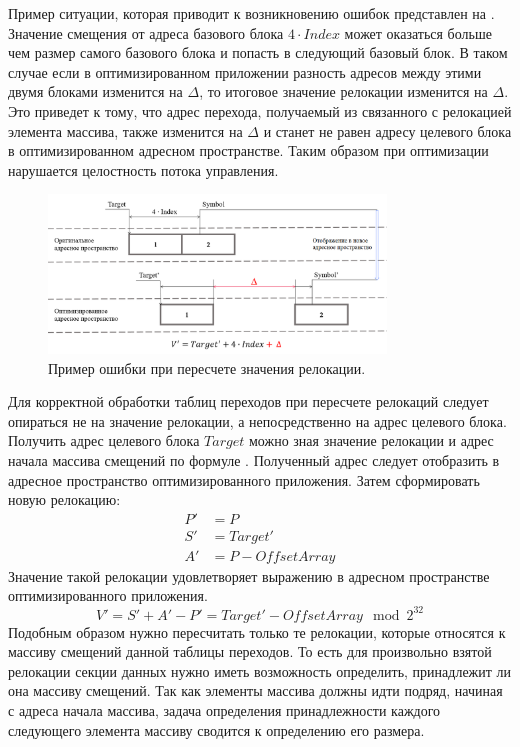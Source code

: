 \documentclass{mipt-thesis-bs}
\begin{document}
    Пример ситуации, которая приводит к возникновению ошибок представлен на . Значение смещения от адреса базового блока $4 \cdot Index$ может оказаться больше чем размер самого базового блока и попасть в следующий базовый блок. В таком случае если в оптимизированном приложении разность адресов между этими двумя блоками изменится на $\Delta$, то итоговое значение релокации изменится на $\Delta$. Это приведет к тому, что адрес перехода, получаемый из связанного с релокацией элемента массива, также изменится на $\Delta$ и станет не равен адресу целевого блока в оптимизированном адресном пространстве. Таким образом при оптимизации нарушается целостность потока управления.

    \begin{figure}[h!]
        \centering
        \includegraphics[width=0.8\textwidth]{pics/bugcase.png}
        \caption{Пример ошибки при пересчете значения релокации.}
        \label{fig:bugcase}
    \end{figure}

    Для корректной обработки таблиц переходов при пересчете релокаций следует опираться не на значение релокации, а непосредственно на адрес целевого блока. Получить адрес целевого блока $Target$ можно зная значение релокации и адрес начала массива смещений по формуле . Полученный адрес следует отобразить в адресное пространство оптимизированного приложения. Затем сформировать новую релокацию:
    \begin{align*}
        P' &= P\\
        S' &= Target'\\
        A' &= P - OffsetArray
    \end{align*}
    Значение такой релокации удовлетворяет выражению  в адресном пространстве оптимизированного приложения.
    $$V' = S' + A' - P' = Target' - OffsetArray \mod 2^{32}$$
    Подобным образом нужно пересчитать только те релокации, которые относятся к массиву смещений данной таблицы переходов. То есть для произвольно взятой релокации секции данных нужно иметь возможность определить, принадлежит ли она массиву смещений. Так как элементы массива должны идти подряд, начиная с адреса начала массива, задача определения принадлежности каждого следующего элемента массиву сводится к определению его размера.
\end{document}
